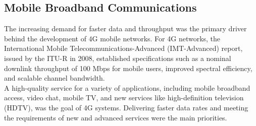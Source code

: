\subsection{Mobile Broadband Communications}
The increasing demand for faster data and throughput was the primary driver behind the development of 4G mobile networks. For 4G networks, the International Mobile Telecommunications-Advanced (IMT-Advanced) report, issued by the ITU-R in 2008, established specifications such as a nominal downlink throughput of 100 Mbps for mobile users, improved spectral efficiency, and scalable channel bandwidth.\\
A high-quality service for a variety of applications, including mobile broadband access, video chat, mobile TV, and new services like high-definition television (HDTV), was the goal of 4G systems. Delivering faster data rates and meeting the requirements of new and advanced services were the main priorities.\\
